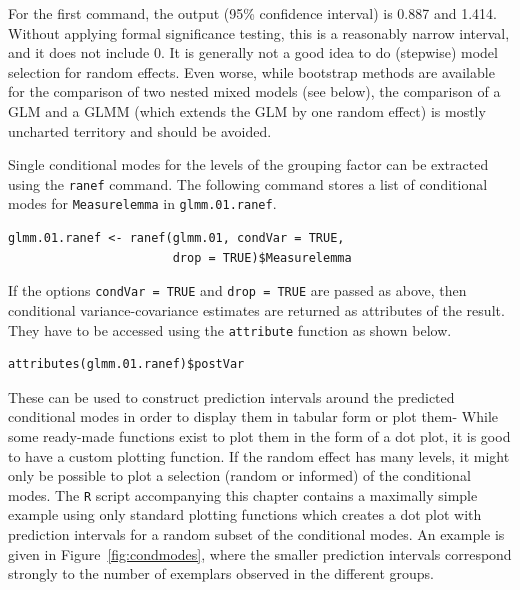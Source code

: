 For the first command, the output (95\% confidence interval) is 0.887 and 1.414.
Without applying formal significance testing, this is a reasonably narrow interval, and it does not include 0.
It is generally not a good idea to do (stepwise) model selection for random effects.
Even worse, while bootstrap methods are available for the comparison of two nested mixed models (see below), the comparison of a GLM and a GLMM (which extends the GLM by one random effect) is mostly uncharted territory and should be avoided.

Single conditional modes for the levels of the grouping factor can be extracted using the \texttt{ranef} command.
The following command stores a list of conditional modes for \texttt{Measurelemma} in \texttt{glmm.01.ranef}.

\vspace{0.5\baselineskip}

\begin{lstlisting}
glmm.01.ranef <- ranef(glmm.01, condVar = TRUE,
                       drop = TRUE)$Measurelemma
\end{lstlisting}

If the options \texttt{condVar = TRUE} and \texttt{drop = TRUE} are passed as above, then conditional variance-covariance estimates are returned as attributes of the result.
They have to be accessed using the \texttt{attribute} function as shown below.

\vspace{0.5\baselineskip}

\begin{lstlisting}
attributes(glmm.01.ranef)$postVar
\end{lstlisting}

These can be used to construct prediction intervals around the predicted conditional modes in order to display them in tabular form or plot them-
While some ready-made functions exist to plot them in the form of a dot plot, it is good to have a custom plotting function.
If the random effect has many levels, it might only be possible to plot a selection (random or informed) of the conditional modes.
The \texttt{R} script accompanying this chapter contains a maximally simple example using only standard plotting functions which creates a dot plot with prediction intervals for a random subset of the conditional modes.
An example is given in Figure~\ref{fig:condmodes}, where the smaller prediction intervals correspond strongly to the number of exemplars observed in the different groups.

